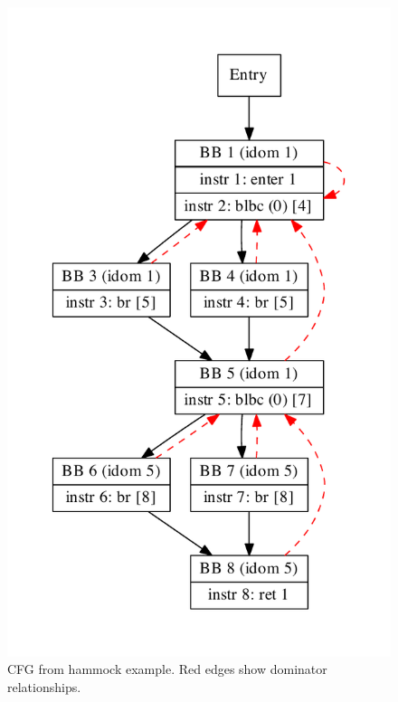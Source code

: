 \documentclass[10pt,twocolumn]{article}
\begin{document}
\begin{figure}
\begin{center}
  \includegraphics[width=0.95\columnwidth]{figs/hammock.pdf}
\begin{minipage}{0.95\columnwidth}
  \caption{\label{fig:hammock} CFG from hammock example. Red edges show dominator relationships.}
\end{minipage}
\end{center}
\end{figure}
\end{document}
